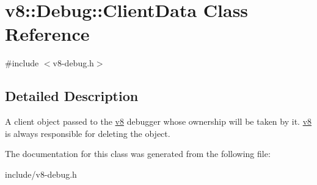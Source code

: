 \hypertarget{classv8_1_1_debug_1_1_client_data}{}\section{v8\+:\+:Debug\+:\+:Client\+Data Class Reference}
\label{classv8_1_1_debug_1_1_client_data}


{\ttfamily \#include $<$v8-\/debug.\+h$>$}



\subsection{Detailed Description}
A client object passed to the \hyperlink{namespacev8}{v8} debugger whose ownership will be taken by it. \hyperlink{namespacev8}{v8} is always responsible for deleting the object. 

The documentation for this class was generated from the following file\+:\begin{DoxyCompactItemize}
\item 
include/v8-\/debug.\+h\end{DoxyCompactItemize}
